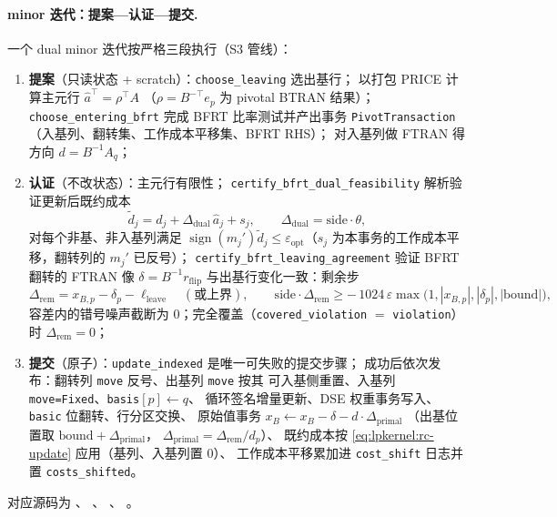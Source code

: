 \paragraph{minor 迭代：提案—认证—提交.}
一个 dual minor 迭代按严格三段执行（S3 管线）：
\begin{enumerate}
  \item \textbf{提案}（只读状态 + scratch）：\texttt{choose\_leaving} 选出基行；
        以打包 PRICE 计算主元行 $\hat a^{\top} = \rho^{\top} A$
        （$\rho = B^{-\top} e_p$ 为 pivotal BTRAN 结果）；
        \texttt{choose\_entering\_bfrt} 完成 BFRT 比率测试并产出事务
        \texttt{PivotTransaction}（入基列、翻转集、工作成本平移集、BFRT RHS）；
        对入基列做 FTRAN 得方向 $d = B^{-1} A_q$；
  \item \textbf{认证}（不改状态）：主元行有限性；
        \texttt{certify\_bfrt\_dual\_feasibility} 解析验证更新后既约成本
        \begin{equation}
          \tilde d_j = d_j + \Delta_{\text{dual}}\, \hat a_j + s_j,
          \qquad \Delta_{\text{dual}} = \mathrm{side}\cdot\theta,
          \label{eq:lpkernel:rc-update}
        \end{equation}
        对每个非基、非入基列满足 $\operatorname{sign}(m_j') \tilde d_j \le
        \varepsilon_{\text{opt}}$（$s_j$ 为本事务的工作成本平移，翻转列的
        $m_j'$ 已反号）；
        \texttt{certify\_bfrt\_leaving\_agreement} 验证 BFRT 翻转的 FTRAN 像
        $\delta = B^{-1} r_{\text{flip}}$ 与出基行变化一致：剩余步
        \begin{equation}
          \Delta_{\text{rem}} = x_{B,p} - \delta_p - \ell_{\text{leave}}
          \quad(\text{或上界}),\qquad
          \mathrm{side}\cdot\Delta_{\text{rem}} \ge
          -\, 1024\,\varepsilon \max\bigl(1, |x_{B,p}|, |\delta_p|,
          |\mathrm{bound}|\bigr),
          \label{eq:lpkernel:leaving-agreement}
        \end{equation}
        容差内的错号噪声截断为 $0$；完全覆盖（\texttt{covered\_violation}
        $=$ \texttt{violation}）时 $\Delta_{\text{rem}} = 0$；
  \item \textbf{提交}（原子）：\texttt{update\_indexed} 是唯一可失败的提交步骤；
        成功后依次发布：翻转列 \texttt{move} 反号、出基列 \texttt{move} 按其
        可入基侧重置、入基列 \texttt{move=Fixed}、\texttt{basis}$[p]\leftarrow q$、
        循环签名增量更新、DSE 权重事务写入、\texttt{basic} 位翻转、行分区交换、
        原始值事务 $x_B \leftarrow x_B - \delta - d\cdot\Delta_{\text{primal}}$
        （出基位置取 $\mathrm{bound} + \Delta_{\text{primal}}$，
        $\Delta_{\text{primal}} = \Delta_{\text{rem}} / d_p$）、
        既约成本按 \eqref{eq:lpkernel:rc-update} 应用（基列、入基列置 $0$）、
        工作成本平移累加进 \texttt{cost\_shift} 日志并置
        \texttt{costs\_shifted}。
\end{enumerate}
对应源码为 、
、
、
。

